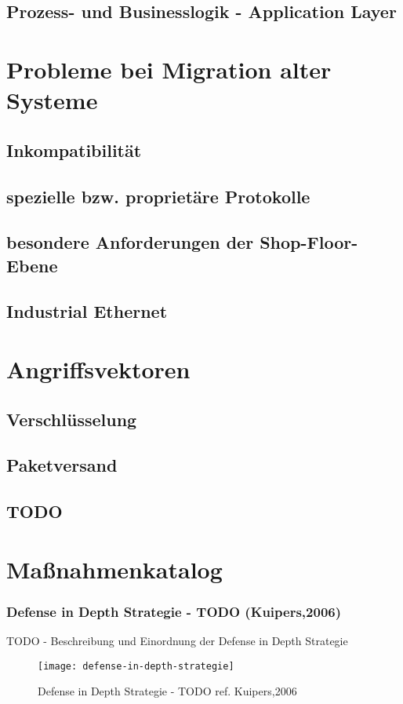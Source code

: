 \subsection{Prozess- und Businesslogik - Application Layer}

\section{Probleme bei Migration alter Systeme}
\subsection{Inkompatibilität}
\subsection{spezielle bzw. proprietäre Protokolle}
\subsection{besondere Anforderungen der Shop-Floor-Ebene}
\subsection{Industrial Ethernet}

\section{Angriffsvektoren}
\subsection{Verschlüsselung}
\subsection{Paketversand}
\subsection{TODO}

\section{Maßnahmenkatalog}
\subsubsection{Defense in Depth Strategie - TODO (Kuipers,2006)}
TODO - Beschreibung und Einordnung der Defense in Depth Strategie

\begin{figure}[h]
    \centering
    \texttt{[image: defense-in-depth-strategie]}
    \caption{Defense in Depth Strategie - TODO ref. Kuipers,2006}
    \label{Kap3:Defense-in-Depth}
\end{figure}